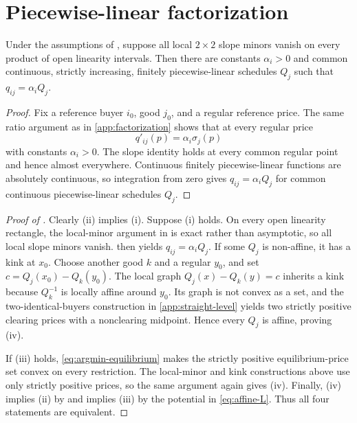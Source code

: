 \section{Piecewise-linear factorization}\label{app:piecewise-factorization}

\begin{lemma}\label{lem:piecewise-factorization}
Under the assumptions of , suppose all local $2\times2$ slope minors vanish on every product of open linearity intervals. Then there are constants $\alpha_i>0$ and common continuous, strictly increasing, finitely piecewise-linear schedules $Q_j$ such that $q_{ij}=\alpha_iQ_j$.
\end{lemma}

\begin{proof}
Fix a reference buyer $i_0$, good $j_0$, and a regular reference price. The same ratio argument as in \ref{app:factorization} shows that at every regular price
\[
q'_{ij}(p)=\alpha_i\sigma_j(p)
\]
with constants $\alpha_i>0$. The slope identity holds at every common regular point and hence almost everywhere. Continuous finitely piecewise-linear functions are absolutely continuous, so integration from zero gives $q_{ij}=\alpha_iQ_j$ for common continuous piecewise-linear schedules $Q_j$.
\end{proof}

\begin{proof}[Proof of ]
Clearly (ii) implies (i). Suppose (i) holds. On every open linearity rectangle, the local-minor argument in  is exact rather than asymptotic, so all local slope minors vanish.  then yields $q_{ij}=\alpha_iQ_j$. If some $Q_j$ is non-affine, it has a kink at $x_0$. Choose another good $k$ and a regular $y_0$, and set $c=Q_j(x_0)-Q_k(y_0)$. The local graph $Q_j(x)-Q_k(y)=c$ inherits a kink because $Q_k^{-1}$ is locally affine around $y_0$. Its graph is not convex as a set, and the two-identical-buyers construction in \ref{app:straight-level} yields two strictly positive clearing prices with a nonclearing midpoint. Hence every $Q_j$ is affine, proving (iv).

If (iii) holds, \eqref{eq:argmin-equilibrium} makes the strictly positive equilibrium-price set convex on every restriction. The local-minor and kink constructions above use only strictly positive prices, so the same argument again gives (iv). Finally, (iv) implies (ii) by  and implies (iii) by the potential in \eqref{eq:affine-L}. Thus all four statements are equivalent.
\end{proof}

